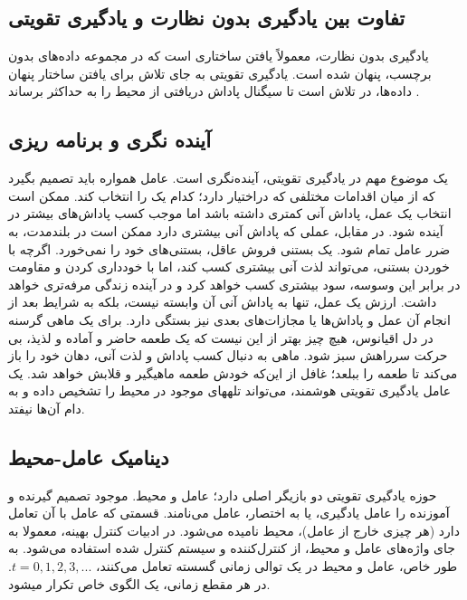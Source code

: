 \subsection*{تفاوت بین یادگیری بدون نظارت و یادگیری تقویتی}
یادگیری بدون نظارت، معمولاً یافتن ساختاری است که در مجموعه داده‌های بدون برچسب، پنهان شده است. یادگیری تقویتی به جای تلاش برای یافتن ساختار پنهان داده‌ها، در تلاش است تا سیگنال پاداش دریافتی از محیط را به حداکثر برساند
\cite{suttonbook}.
\subsection{آینده نگری و برنامه ریزی}
یک موضوع مهم در یادگیری تقویتی، آینده‌نگری است. عامل همواره باید تصمیم بگیرد که از میان اقدامات مختلفی که دراختیار دارد؛ کدام یک را انتخاب کند. ممکن است انتخاب یک عمل، پاداش آنی کمتری داشته باشد اما موجب کسب پاداش‌های بیشتر در آینده شود. در مقابل، عملی که پاداش آنی بیشتری دارد ممکن است در بلند‌مدت، به ضرر عامل تمام شود.  یک بستنی فروش عاقل، بستنی‌های خود را نمی‌خورد. اگرچه با خوردن بستنی، می‌تواند لذت  آنی بیشتری کسب کند، اما با خودداری کردن و مقاومت در برابر این وسوسه، سود بیشتری کسب ‌خواهد کرد و در آینده زندگی مرفه‌تری خواهد داشت.
ارزش یک عمل، تنها به پاداش آنی آن وابسته نیست، بلکه به شرایط بعد از انجام آن عمل و پاداش‌ها یا مجازات‌های بعدی نیز بستگی دارد. برای یک ماهی گرسنه در دل اقیانوس، هیچ چیز بهتر از این نیست که یک طعمه حاضر و آماده و لذیذ، بی حرکت سرراهش سبز شود. ماهی به دنبال کسب پاداش و لذت آنی، دهان خود را باز می‌کند تا طعمه را ببلعد؛ غافل از این‌که خودش طعمه ماهیگیر و قلابش خواهد شد. یک عامل یادگیری تقویتی هوشمند، می‌تواند تله\nf های موجود در محیط را تشخیص داده و به دام آن‌ها نیفتد.
\subsection{دینامیک عامل-محیط}
حوزه یادگیری تقویتی  دو بازیگر اصلی دارد؛ عامل و محیط. موجود تصمیم گیرنده و آموزنده را عامل یادگیری، یا به اختصار، عامل می‌نامند. قسمتی که عامل با آن تعامل دارد (هر چیزی خارج از عامل)، محیط نامیده می‌شود. در ادبیات کنترل بهینه، معمولا به جای واژه‌های عامل و محیط، از  کنترل‌کننده
و سیستم کنترل شده استفاده می‌شود. به طور خاص، عامل و محیط در یک توالی زمانی گسسته تعامل می‌کنند، 
$t = 0,1,2,3,...$.
در هر مقطع زمانی، یک الگوی خاص تکرار می\nf شود.

